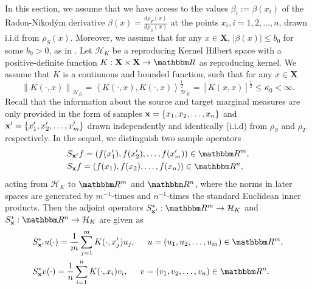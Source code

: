 \documentclass[USenglish]{article}
\newcommand{\norm}[1]{\left\lVert#1\right\rVert}
\newcommand{\innerpro}[1]{\left\langle#1\right\rangle}
\newcommand{\bX}{\mathbf{X}}
\newcommand{\x}{{\bf x}}
\def\R{\mathbbm R}
\begin{document}
In this section, we assume that we have access to the values $\beta_i:=\beta(x_i)$ of the Radon-Nikod\'ym derivative $\beta (x) = \frac{d \rho_T (x)}{d\rho_S (x)} $ at the points $x_i, i = 1,2,\ldots,n$, drawn i.i.d from $\rho_S (x)$.
Moreover, we assume that for any $x \in \mathbf{X}$, $| \beta(x)| \leq b_0$ for some $b_0 > 0 $, as in \cite{huang2006}. Let $\mathcal{H}_K$ be a reproducing Kernel Hilbert space with a positive-definite function $K: \bX \times \bX \rightarrow \R$ as reproducing kernel. We assume that $K$ is a continuous and bounded function, such that for any $x \in \mathbf{X} $ $$\norm{K(\cdot,x)}_{\mathcal{H}_K} = \innerpro{K(\cdot,x), K(\cdot,x)}_{\mathcal{H}_K}^\frac{1}{2} = [K(x,x)]^\frac{1}{2} \leq \kappa_0 < \infty. $$
Recall that the information about the source and target marginal measures are only provided in the form of samples $\x = \{x_1, x_2,\ldots,x_n\} $ and $\x' = \{x_1', x_2',\ldots,x_m'\}$ drawn independently and identically (i.i.d) from $\rho_S$ and $\rho_T$ respectively. In the sequel, we distinguish two sample operators
\begin{align*}
&S_{\x'} f = (f(x_1'), f(x_2'),\ldots,f(x_m')) \in \R^m,\\
&S_{\x} f = (f(x_1), f(x_2),\ldots,f(x_n)) \in \R^n,
\end{align*}
acting from $\mathcal{H}_K$ to $\R^m$ and $\R^n$, where the norms in later spaces are generated by $m^{-1}$-times and $n^{-1}$-times the standard Euclidean inner products. Then the adjoint operators $S_{\x'}^*: \R^m \rightarrow \mathcal{H}_K$ and 
$S_{\x}^*: \R^n \rightarrow \mathcal{H}_K$ are given as
\begin{align*}
&S_{\x'}^* u(\cdot) = \frac{1}{m} \sum_{j = 1}^m K(\cdot, x_j') u_j, \hspace*{0.5cm} u = (u_1,u_2,\ldots,u_m) \in \R^m, \\
&S_{\x}^* v(\cdot) = \frac{1}{n} \sum_{i = 1}^n K(\cdot, x_i) v_i,\hspace*{0.5cm} v = (v_1,v_2,\ldots,v_n) \in \R^n.
\end{align*}
\end{document}
